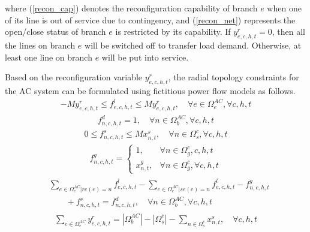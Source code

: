 \documentclass[a4paper,fleqn]{cas-dc}
\begin{document}
\noindent where (\ref{recon_cap}) denotes the reconfiguration capability of 
branch $ e $ when one of its line is out of service due to contingency, and
(\ref{recon_net}) represents the open/close status of branch $ e $ is 
restricted by its capability. If $ y_{e,c,h,t}^{r} = 0 $, then all the lines 
on branch $ e $ will be switched off to transfer load demand. Otherwise, 
at least one line on branch $ e $ will be put into service.

Based on the reconfiguration variable $ y_{e,c,h,t}^{r} $, the radial topology 
constraints for the AC system can be formulated using fictitious power flow 
models \cite{Muñoz-Delgado_2018_Distribution,Wu_2018_bi-level} as follows.
\begin{align}
    \label{fic_flow}
    -M y_{e,c,h,t}^{r} \leq f_{e,c,h,t}^{l} \leq M y_{e,c,h,t}^{r},
    \quad \forall e \in \Omega_{e}^{AC},
    \forall c,h,t
\end{align}
\begin{align}
    \label{fic_load}
    f_{n,c,h,t}^{d} = 1,
    \quad \forall n \in \Omega_{b}^{AC},
    \forall c,h,t
\end{align}
\begin{align}
    \label{fic_sub}
    0 \leq f_{n,c,h,t}^{s} \leq M x_{n,t}^{s},
    \quad \forall n \in \Omega_{s}^{c},
    \forall c,h,t
\end{align}
\begin{align}
    \label{fic_dg}
    f_{n,c,h,t}^{g} = 
    \begin{cases}
    1, & \forall n \in \Omega_{g}^{e},c,h,t \\
    x_{n,t}^{g}, & \forall n \in \Omega_{g}^{c},
    \forall c,h,t
    \end{cases}
\end{align}
\begin{align}
    \label{fic_balance}
    \begin{aligned}
        &
        \sum_{e \in \Omega_{e}^{AC} | re(e) = n} f_{e,c,h,t}^{l} - 
        \sum_{e \in \Omega_{e}^{AC} | se(e) = n} f_{e,c,h,t}^{l} -
        f_{n,c,h,t}^{g} \\ 
        & \quad \quad +
        f_{n,c,h,t}^{s} = f_{n,c,h,t}^{d},
        \quad \forall n \in \Omega_{b}^{AC},
        \forall c,h,t
    \end{aligned}
\end{align}
\begin{align}
    \label{fic_radial}
    \sum_{e \in \Omega_{e}^{AC}} y_{e,c,h,t}^{r} = 
    | \Omega_{b}^{AC} | - | \Omega_{s}^{e} | -
    \sum_{n \in \Omega_{s}^{c}} x_{n,t}^{s},
    \quad \forall c,h,t
\end{align}
\end{document}

